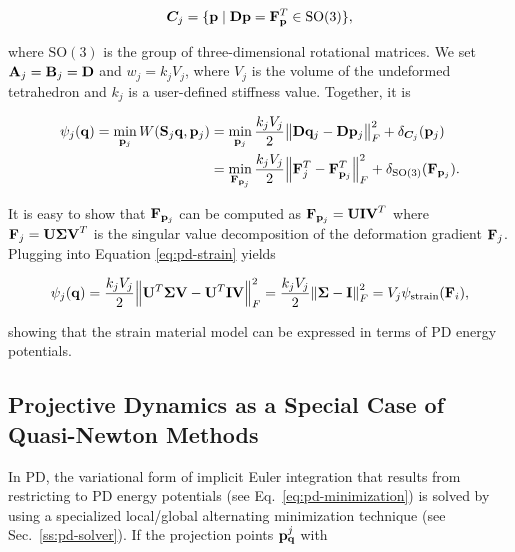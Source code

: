 \begin{equation}\label{eq:pd-strain-constraint}
    \bm{C}_j = \{ \mathbf{p} \mid \mathbf{D}\mathbf{p} = \mathbf{F}_\mathbf{p}^T \in \text{SO}(3) \},
\end{equation}

\noindent where $\text{SO}(3)$ is the group of three-dimensional rotational matrices. We set $\mathbf{A}_j = \mathbf{B}_j = \mathbf{D}$ and $w_j = k_jV_j$, 
where $V_j$ is the volume of the undeformed tetrahedron and $k_j$ is a user-defined stiffness value. Together, it is

\begin{align}
    \begin{split}\label{eq:pd-strain}    
    \psi_j(\mathbf{q}) 
    = \min_{\mathbf{p}_j} W(\mathbf{S}_j\mathbf{q}, \mathbf{p}_j) 
    &= \min_{\mathbf{p}_j} \frac{k_jV_j}{2} \norm{\mathbf{D}\mathbf{q}_j - \mathbf{D}\mathbf{p}_j}^2_F + \delta_{\bm{C}_j}(\mathbf{p}_j) \\
    &= \min_{\mathbf{F}_{\mathbf{p}_j}} \frac{k_jV_j}{2} \norm{\mathbf{F}_j^T - \mathbf{F}_{\mathbf{p}_j}^T}^2_F + \delta_{\text{SO}(3)}(\mathbf{F}_{\mathbf{p}_j}).
    \end{split}
\end{align}

\noindent It is easy to show that $\mathbf{F}_{\mathbf{p}_j}$ can be computed as $\mathbf{F}_{\mathbf{p}_j} = \mathbf{UIV}^T$ where $\mathbf{F}_j = 
\mathbf{U \Sigma V}^T$ is the singular value decomposition of the deformation gradient $\mathbf{F}_j$. Plugging into Equation \ref{eq:pd-strain}
yields

\[
    \psi_j(\mathbf{q}) = \frac{k_jV_j}{2} \norm{\mathbf{U}^T\mathbf{\Sigma}\mathbf{V} - \mathbf{U}^T\mathbf{I}\mathbf{V}}^2_F 
    = \frac{k_jV_j}{2} \norm{\mathbf{\Sigma} - \mathbf{I}}^2_F = V_j \psi_{\text{strain}}(\mathbf{F}_i),
\]

\noindent showing that the strain material model can be expressed in terms of PD energy potentials.

\subsection{Projective Dynamics as a Special Case of Quasi-Newton Methods}\label{ss:pd-quasi-newton}
In PD, the variational form of implicit Euler integration that results from restricting to PD energy potentials (see Eq.\ \ref{eq:pd-minimization}) 
is solved by using a specialized local/global alternating minimization technique (see Sec.\ \ref{ss:pd-solver}). If the projection points 
$\mathbf{p}^j_{\mathbf{q}}$ with 

